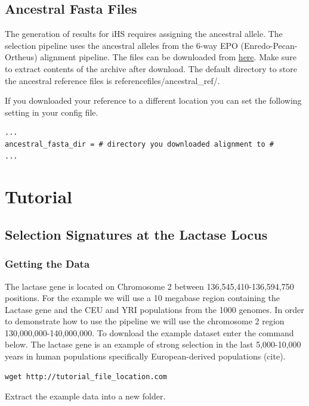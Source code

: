 \subsection{Ancestral Fasta Files}
The generation of results for iHS requires assigning the ancestral allele. The selection pipeline uses the ancestral alleles from the 6-way EPO (Enredo-Pecan-Ortheus) alignment pipeline. The files can be downloaded from \href{ftp://ftp.1000genomes.ebi.ac.uk/vol1/ftp/phase1/analysis_results/supporting/ancestral_alignments/human_ancestor_GRCh37_e59.tar.bz2}{here}. Make sure to extract contents of the archive after download. The default directory to store the ancestral reference files is referencefiles/ancestral\_ref/.

If you downloaded your reference to a different location you can set the following setting in your config file.\\
\begin{verbatim}
...
ancestral_fasta_dir = # directory you downloaded alignment to #
...
\end{verbatim}

\section{Tutorial}
\subsection{Selection Signatures at the Lactase Locus}
\subsubsection{Getting the Data}
The lactase gene is located on Chromosome 2 between 136,545,410-136,594,750 positions. For the example we will use a 10 megabase region containing the Lactase gene and the CEU and YRI populations from the 1000 genomes. In order to demonstrate how to use the pipeline we will use the chromosome 2 region 130,000,000-140,000,000. To download the example dataset enter the command below. The lactase gene is an example of strong selection in the last 5,000-10,000 years in human populations specifically European-derived populations (cite).  \\

\begin{verbatim}
wget http://tutorial_file_location.com 
\end{verbatim}

Extract the example data into a new folder.

